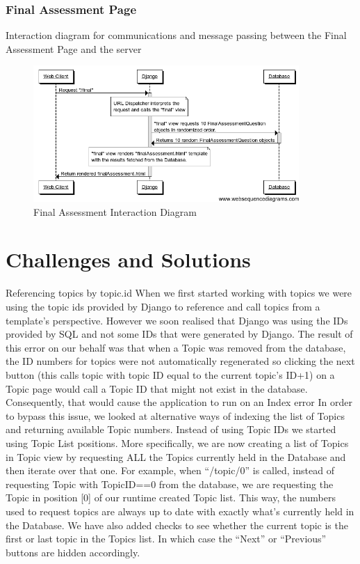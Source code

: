 \documentclass{l3proj}
\begin{document}
{\subsubsection{Final Assessment Page}
Interaction diagram for communications and message passing between the Final Assessment Page and the server
\begin{figure}[!htb]
\caption{Final Assessment Interaction Diagram}
 \centering
\includegraphics[width=0.9\textwidth]{images/finalAssessmentInteractionDiagram.png}
\end{figure}
\section{Challenges and Solutions}
Referencing topics by topic.id
When we first started working with topics we were using the topic ids provided by Django to reference and call topics from a template's perspective. However we soon realised that Django was using the IDs provided by SQL and not some IDs that were generated by Django. The result of this error on our behalf was that when a Topic was removed from the database, the ID numbers for topics were not automatically regenerated so clicking the next button (this calls topic with topic ID equal to the current topic's ID+1) on a Topic page would call a Topic ID that might not exist in the database. Consequently, that would cause the application to run on an Index error In order to bypass this issue, we looked at alternative ways of indexing the list of Topics and returning available Topic numbers.  Instead of using Topic IDs we started using Topic List positions. More specifically, we are now creating a list of Topics in Topic view by requesting ALL the Topics currently held in the Database and then iterate over that one. For example, when “/topic/0” is called, instead of requesting Topic with TopicID==0 from the database, we are requesting the Topic in position [0] of our runtime created Topic list. This way, the numbers used to request topics are always up to date with exactly what's currently held in the Database.  We have also added checks to see whether the current topic is the first or last topic in the Topics list. In which case the “Next” or “Previous” buttons are hidden accordingly.

}
\end{document}

